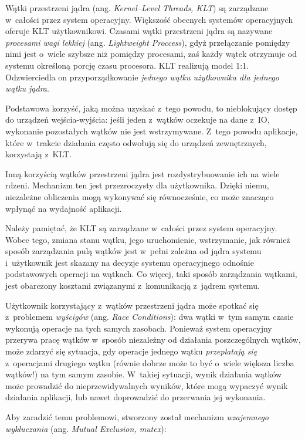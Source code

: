\documentclass{mwart}
\begin{document}
%
\indent
	Wątki przestrzeni jądra (ang. \emph{Kernel--Level Threads, KLT}) są zarządzane w~całości przez system operacyjny. 
	Większość obecnych systemów operacyjnych oferuje KLT użytkownikowi. Czasami wątki przestrzeni jądra są nazywane
	\emph{procesami wagi lekkiej} (ang. \emph{Lightweight Proccess}), gdyż przełączanie pomiędzy nimi jest o~wiele
	szybsze niż pomiędzy procesami, zaś każdy wątek otrzymuje od systemu określoną porcję czasu procesora.
	KLT realizują model 1:1. Odzwierciedla on przyporządkowanie \emph{jednego wątku użytkownika dla jednego wątku jądra}.
\par
%
\indent
	Podstawowa korzyść, jaką można uzyskać z~tego powodu, to nieblokujący dostęp do urządzeń wejścia-wyjścia:
	jeśli jeden z~wątków oczekuje na dane z~IO, wykonanie pozostałych wątków nie jest wstrzymywane.
	Z~tego powodu aplikacje, które w~trakcie działania często odwołują się do urządzeń zewnętrznych, korzystają
	z~KLT.
\par
%
\indent
	Inną korzyścią wątków przestrzeni jądra jest rozdystrybuowanie ich na wiele rdzeni. Mechanizm ten jest przezroczysty
	dla użytkownika. Dzięki niemu, niezależne obliczenia mogą wykonywać się równocześnie, co może znacząco wpłynąć na
	wydajność aplikacji.
\par
%
\indent
	Należy pamiętać, że KLT są zarządzane w~całości przez system operacyjny. Wobec tego, zmiana stanu wątku, jego uruchomienie,
	wstrzymanie, jak również sposób zarządzania pulą wątków jest w~pełni zależna od jądra systemu i~użytkownik jest skazany
	na decyzje systemu operacyjnego odnośnie podstawowych operacji na wątkach. Co więcej, taki sposób zarządzania wątkami,
	jest obarczony kosztami związanymi z~komunikacją z~jądrem systemu.
\par
%
\indent
	Użytkownik korzystający z~wątków przestrzeni jądra może spotkać się z~problemem \emph{wyścigów} (ang. \emph{Race Conditions}):
	dwa wątki w~tym samym czasie wykonują operacje na tych samych zasobach. Ponieważ system operacyjny przerywa pracę wątków w~sposób
	niezależny od działania poszczególnych wątków, może zdarzyć się sytuacja, gdy operacje jednego wątku \emph{przeplatają się} z~operacjami
	drugiego wątku (równie dobrze może to być o~wiele większa liczba wątków!) na tym samym zasobie. W~takiej sytuacji, wynik działania wątków
	może prowadzić do nieprzewidywalnych wyników, które mogą wypaczyć wynik działania aplikacji, lub nawet doprowadzić do przerwania jej wykonania.
\par
%
\indent
	Aby zaradzić temu problemowi, stworzony został mechanizm \emph{wzajemnego wykluczania} (ang. \emph{Mutual Exclusion, mutex}):
\end{document}
